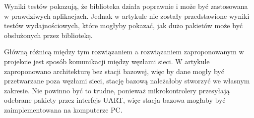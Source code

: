 Wyniki testów pokazują, że biblioteka działa poprawnie i może być zastosowana w prawdziwych aplikacjach. Jednak w artykule nie zostały przedstawione wyniki testów wydajnościowych, które mogłyby pokazać, jak dużo pakietów może być obsłużonych przez bibliotekę.

Główną różnicą między tym rozwiązaniem a rozwiązaniem zaproponowanym w projekcie jest sposób komunikacji między węzłami sieci. W artykule zaproponowano architekturę bez stacji bazowej, więc by dane mogły być przetwarzane poza węzłami sieci, stację bazową należałoby stworzyć we własnym zakresie. Nie powinno być to trudne, ponieważ mikrokontrolery przesyłają odebrane pakiety przez interfejs UART, więc stacja bazowa mogłaby być zaimplementowana na komputerze PC.

